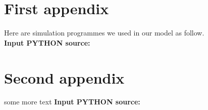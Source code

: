 \documentclass{mcmthesis}
\begin{document}
\newpage

\begin{appendices}

    \section{First appendix}

    Here are simulation programmes we used in our model as follow.\\

    \textbf{\textcolor[rgb]{0.98,0.00,0.00}{Input PYTHON source:}}
    

    \section{Second appendix}

    some more text \textcolor[rgb]{0.98,0.00,0.00}{\textbf{Input PYTHON source:}}
    

\end{appendices}
\end{document}
